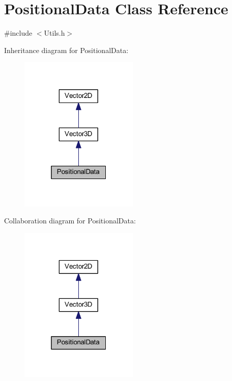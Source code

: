\hypertarget{class_positional_data}{}\section{Positional\+Data Class Reference}
\label{class_positional_data}


{\ttfamily \#include $<$Utils.\+h$>$}



Inheritance diagram for Positional\+Data\+:\nopagebreak
\begin{figure}[H]
\begin{center}
\leavevmode
\includegraphics[width=160pt]{class_positional_data__inherit__graph}
\end{center}
\end{figure}


Collaboration diagram for Positional\+Data\+:\nopagebreak
\begin{figure}[H]
\begin{center}
\leavevmode
\includegraphics[width=160pt]{class_positional_data__coll__graph}
\end{center}
\end{figure}
